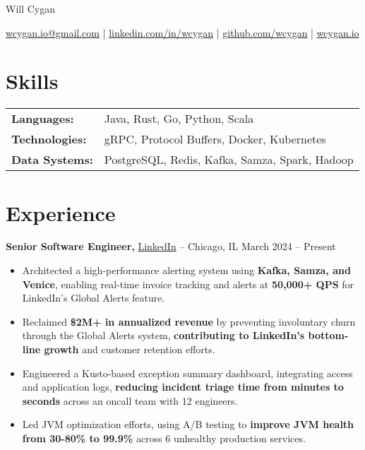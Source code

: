 \documentclass[10pt]{article}
\begin{document}
\centerline{\Huge Will Cygan}

\vspace{5pt}

\centerline{\href{mailto:wcygan.io@gmail.com}{wcygan.io@gmail.com} | \href{https://linkedin.com/in/wcygan}{linkedin.com/in/wcygan} | \href{https://github.com/wcygan}{github.com/wcygan} | \href{https://www.wcygan.io}{wcygan.io}}

\vspace{5pt}

\section*{Skills}
\vspace{4pt}
\begin{tabular}{@{}ll@{}}
\textbf{Languages:} & Java, Rust, Go, Python, Scala \\
\textbf{Technologies:} & gRPC, Protocol Buffers, Docker, Kubernetes \\
\textbf{Data Systems:} & PostgreSQL, Redis, Kafka, Samza, Spark, Hadoop
\end{tabular}

\vspace{5pt}

\section*{Experience}
\vspace{4pt}
\textbf{Senior Software Engineer,} \href{https://www.linkedin.com/}{LinkedIn} -- Chicago, IL \hfill March 2024 -- Present
\vspace{-4pt}
\begin{itemize}
  \item Architected a high-performance alerting system using \textbf{Kafka, Samza, and Venice}, enabling real-time invoice tracking and alerts at \textbf{50,000+ QPS} for LinkedIn's Global Alerts feature.
  \item Reclaimed \textbf{\$2M+ in annualized revenue} by preventing involuntary churn through the Global Alerts system, \textbf{contributing to LinkedIn's bottom-line growth} and customer retention efforts.
  \item Engineered a Kusto-based exception summary dashboard, integrating access and application logs, \textbf{reducing incident triage time from minutes to seconds} across an oncall team with 12 engineers.
  \item Led JVM optimization efforts, using A/B testing to \textbf{improve JVM health from 30-80\% to 99.9\%} across 6 unhealthy production services.
\end{itemize}
\end{document}
